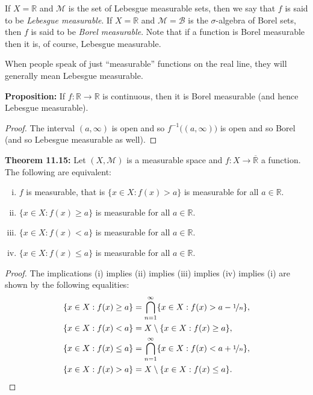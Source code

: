 \documentclass[12pt]{book}
\newcommand{\R}{{\mathbb{R}}}
\newcommand{\sB}{{\mathcal{B}}}
\newcommand{\sM}{{\mathcal{M}}}
\theoremstyle{plain}
\theoremstyle{remark}
\theoremstyle{definition}
\theoremstyle{exercise}
\theoremstyle{example}
\begin{document}
\medskip

If $X=\R$ and $\sM$ is the set of Lebesgue measurable sets, then
we say that $f$ is said to be \emph{Lebesgue measurable}.  If $X=\R$ and
$\sM =\sB$ is the $\sigma$-algebra of Borel sets, then
$f$ is said to be \emph{Borel measurable}.  Note that if a function is
Borel measurable then it is, of course, Lebesgue measurable.

When people speak of just ``measurable'' functions on the real line, they will
generally mean Lebesgue measurable.

\medskip

\textbf{Proposition:}
If $f \colon \R \to \R$ is continuous, then 
it is Borel measurable
(and hence Lebesgue measurable).

\medskip

\begin{proof}
The interval $(a,\infty)$ is open and so
$f^{-1}\bigl( (a,\infty) \bigr)$ is open and so Borel (and so Lebesgue
measurable as well).
\end{proof}

\medskip

\textbf{Theorem 11.15:}
Let $(X,\sM)$ is a measurable space and $f \colon X \to \overline{\R}$ 
a function.
The following are equivalent:
\begin{enumerate}[(i)]
\item $f$ is measurable, that is $\{ x \in X : f(x) > a \}$ is measurable for
all $a \in \R$.
\item $\{ x \in X : f(x) \geq a \}$ is measurable for all $a \in \R$.
\item $\{ x \in X : f(x) < a \}$ is measurable for all $a \in \R$.
\item $\{ x \in X : f(x) \leq a \}$ is measurable for all $a \in \R$.
\end{enumerate}

\medskip

\begin{proof}
The implications (i) implies (ii) implies (iii) implies (iv) implies (i)
are shown by the following equalities:
\begin{align*}
& \{ x \in X : f(x) \geq a \} = \bigcap_{n=1}^\infty
\{ x \in X : f(x) > a - \nicefrac{1}{n} \} ,
\\
&
\{ x \in X : f(x) < a \} = X \setminus \{ x \in X : f(x) \geq a \} ,
\\
&
\{ x \in X : f(x) \leq a \} = \bigcap_{n=1}^\infty
\{ x \in X : f(x) < a  + \nicefrac{1}{n} \} ,
\\
&
\{ x \in X : f(x) > a \} = X \setminus \{ x \in X : f(x) \leq a \} .
\end{align*}
\end{proof}
\end{document}
